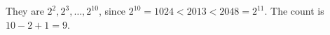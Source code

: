 They are $2^2,2^3,\ldots,2^{10}$, since $2^{10}=1024<2013<2048=2^{11}$. The count is $10-2+1=\boxed9$.
